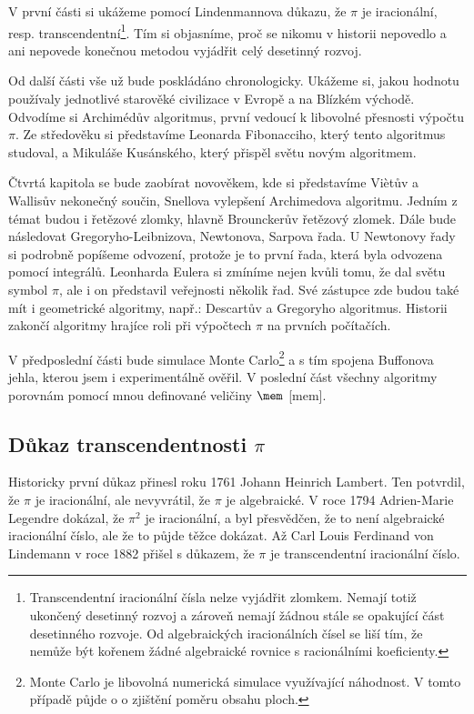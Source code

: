 \documentclass[soc]{gzwroc} %
\begin{document}
V první části si ukážeme pomocí Lindenmannova důkazu, že $\pi$ je iracionální, resp. transcendentní\footnote[2]{Transcendentní iracionální čísla nelze vyjádřit zlomkem. Nemají totiž ukončený desetinný rozvoj a zároveň nemají žádnou stále se opakující část desetinného rozvoje. Od algebraických  iracionálních čísel se liší tím, že nemůže být kořenem žádné algebraické rovnice s racionálními koeficienty.}. Tím si objasníme, proč se nikomu v historii nepovedlo a ani nepovede konečnou metodou vyjádřit celý desetinný rozvoj.

Od další části vše už bude poskládáno chronologicky. Ukážeme si, jakou hodnotu používaly jednotlivé starověké civilizace v Evropě a na Blízkém východě. Odvodíme si Archimédův algoritmus, první vedoucí k libovolné přesnosti výpočtu $\pi$.
Ze středověku si představíme Leonarda Fibonacciho, který tento algoritmus studoval, a Mikuláše Kusánského, který přispěl světu novým algoritmem.

Čtvrtá kapitola se bude zaobírat novověkem, kde si představíme Viètův a Wallisův nekonečný součin, Snellova vylepšení Archimedova algoritmu. Jedním z témat budou i řetězové zlomky, hlavně Brounckerův řetězový zlomek. Dále bude následovat Gregoryho-Leibnizova, Newtonova, Sarpova řada. U Newtonovy řady si podrobně popíšeme odvození, protože je to první řada, která byla odvozena pomocí integrálů. Leonharda Eulera si zmíníme nejen kvůli tomu, že dal světu symbol $\pi$, ale i on představil veřejnosti několik řad. Své zástupce zde budou také mít i geometrické algoritmy, např.: Descartův a Gregoryho algoritmus. Historii zakončí algoritmy hrajíce roli při výpočtech $\pi$ na prvních počítačích.

V předposlední části bude simulace Monte Carlo\footnote[3]{Monte Carlo je libovolná numerická simulace využívající náhodnost. V tomto případě půjde o o zjištění poměru obsahu ploch.} a s tím spojena Buffonova jehla, kterou jsem i experimentálně ověřil. V poslední část všechny algoritmy porovnám pomocí mnou definované veličiny $\mem$ [mem].
\subsection{Důkaz transcendentnosti $\pi$}
Historicky první důkaz přinesl roku 1761 Johann Heinrich Lambert. Ten potvrdil, že $\pi$ je iracionální, ale nevyvrátil, že $\pi$ je algebraické. V roce 1794 Adrien-Marie Legendre dokázal, že $\pi^2$ je iracionální, a byl přesvědčen, že to není algebraické iracionální číslo, ale že to půjde těžce dokázat. Až Carl Louis Ferdinand von Lindemann v roce 1882 přišel s důkazem, že $\pi$ je transcendentní iracionální číslo.
\end{document}
